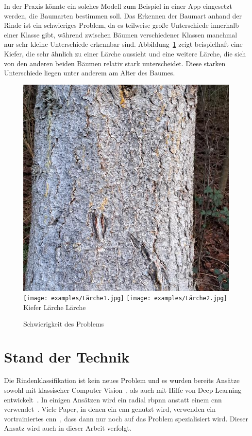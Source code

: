 \documentclass{article}
\begin{document}
In der Praxis könnte ein solches Modell zum Beispiel in einer App eingesetzt werden, 
die Baumarten bestimmen soll. 
Das Erkennen der Baumart anhand der Rinde ist ein schwieriges Problem, 
da es teilweise gro\ss e Unterschiede innerhalb einer Klasse gibt,
während zwischen Bäumen verschiedener Klassen manchmal nur sehr kleine Unterschiede erkennbar sind. 
Abbildung~\ref{problem} zeigt beispielhaft eine Kiefer, 
die sehr ähnlich zu einer Lärche aussieht 
und eine weitere Lärche, die sich von den anderen 
beiden Bäumen relativ stark unterscheidet.
Diese starken Unterschiede liegen unter anderem am Alter des Baumes.

\begin{figure}[htbp!]
  \centering
  \includegraphics[width=0.32\linewidth]{examples/Kiefer.jpg}
  \texttt{[image: examples/Lärche1.jpg]}
  \texttt{[image: examples/Lärche2.jpg]}\\
  Kiefer \hspace{100px} Lärche \hspace{100px} Lärche
  \caption{Schwierigkeit des Problems}
  \label{problem}
\end{figure}

\section{Stand der Technik}
Die Rindenklassifikation ist kein neues Problem und es wurden bereits Ansätze sowohl mit klassischer Computer Vision~\cite{bark_texture}, als auch mit Hilfe von Deep Learning entwickelt~\cite{1_CNN_bark}.
In einigen Ansätzen wird ein radial \ac{rbpnn} anstatt einem \ac{cnn} verwendet~\cite{rbpnn_bark}.
Viele Paper, in denen ein \ac{cnn} genutzt wird, verwenden ein vortrainiertes \ac{cnn}~\cite{1_CNN_bark},
dass dann nur noch auf das Problem spezialisiert wird.
Dieser Ansatz wird auch in dieser Arbeit verfolgt.
\end{document}
